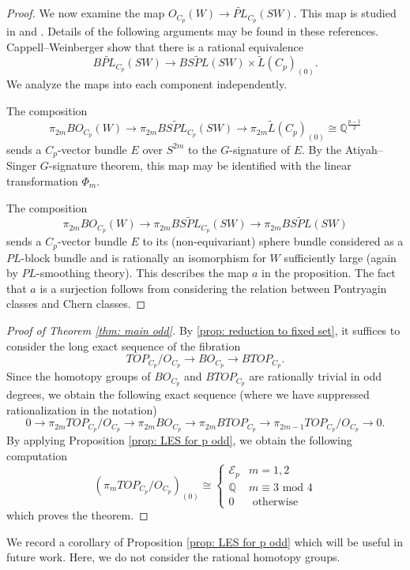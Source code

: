 \documentclass[11pt, twoside]{amsart}
\theoremstyle{plain}
\theoremstyle{definition}
\theoremstyle{remark}
\newcommand{\Q}{\mathbb Q}
\newcommand{\mc}[1]{\mathcal{{#1}}}
\begin{document}
\begin{proof}
We now examine the map $O_{C_p}(W)\rightarrow\widetilde{PL}_{C_p}(SW)$.
This map is studied in \cite{CappellWeinbergerSimpleAS} and \cite{WangChern}.
Details of the following arguments may be found in these references.
Cappell--Weinberger show that there is a rational equivalence
\[
B\widetilde{PL}_{C_p}(SW)\rightarrow B\widetilde{SPL}(SW)\times\tilde{L}(C_p)_{(0)}.
\]
We analyze the maps into each component independently.

The composition
\[
\pi_{2m}BO_{C_p}(W)\rightarrow\pi_{2m}B\widetilde{SPL}_{C_p}(SW)\rightarrow\pi_{2m}\tilde{L}(C_p)_{(0)}\cong\Q^{\frac{p-1}{2}}
\]
sends a $C_p$-vector bundle $E$ over $S^{2m}$ to the $G$-signature of $E$.
By the Atiyah--Singer $G$-signature theorem, this map may be identified with the linear transformation $\Phi_m$.

The composition
\[
\pi_{2m}BO_{C_p}(W)\rightarrow \pi_{2m}B\widetilde{SPL}_{C_p}(SW)\rightarrow \pi_{2m} B\widetilde{SPL}(SW)
\]
sends a $C_p$-vector bundle $E$ to its (non-equivariant) sphere bundle considered as a $PL$-block bundle and is rationally an isomorphism for $W$ sufficiently large (again by $PL$-smoothing theory).
This describes the map $a$ in the proposition.
The fact that $a$ is a surjection follows from considering the relation between Pontryagin classes and Chern classes.
\end{proof}

\begin{proof}[Proof of Theorem \ref{thm: main odd}]
By \ref{prop: reduction to fixed set}, it suffices to consider the long exact sequence of the fibration
\[
TOP_{C_p}/O_{C_p}\to BO_{C_p}\to BTOP_{C_p}.
\]
Since the homotopy groups of $BO_{C_p}$ and $BTOP_{C_p}$ are rationally trivial in odd degrees, we obtain the following exact sequence (where we have suppressed rationalization in the notation)
\[
0\to\pi_{2m}TOP_{C_p}/O_{C_p}\to\pi_{2m}BO_{C_p}\to\pi_{2m}BTOP_{C_p}\to\pi_{2m-1}TOP_{C_p}/O_{C_p}\to0.
\]
By applying Proposition \ref{prop: LES for p odd}, we obtain the following computation
\[
(\pi_m TOP_{C_p}/ O_{C_p})_{(0)}\cong\begin{cases}\mc{E}_p&m=1,2\\ \Q&m\equiv 3\text{ mod }4\\0&\text{ otherwise}\end{cases}
\]
which proves the theorem.
\end{proof}

We record a corollary of Proposition \ref{prop: LES for p odd} which will be useful in future work.
Here, we do not consider the rational homotopy groups.
\end{document}
